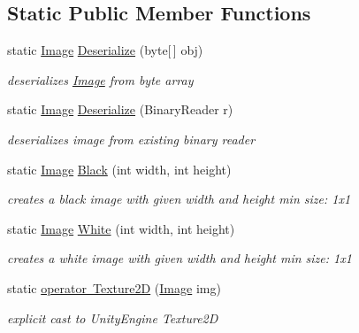 \subsection*{Static Public Member Functions}
\begin{DoxyCompactItemize}
\item 
static \mbox{\hyperlink{class_virt_muse_web_1_1_utility_1_1_image}{Image}} \mbox{\hyperlink{class_virt_muse_web_1_1_utility_1_1_image_ab45d281959b7e4d99408631f57f1d372}{Deserialize}} (byte\mbox{[}$\,$\mbox{]} obj)
\begin{DoxyCompactList}\small\item\em deserializes \mbox{\hyperlink{class_virt_muse_web_1_1_utility_1_1_image}{Image}} from byte array \end{DoxyCompactList}\item 
static \mbox{\hyperlink{class_virt_muse_web_1_1_utility_1_1_image}{Image}} \mbox{\hyperlink{class_virt_muse_web_1_1_utility_1_1_image_a0d1b4f954a69ba6cd90639d0d605a814}{Deserialize}} (Binary\+Reader r)
\begin{DoxyCompactList}\small\item\em deserializes image from existing binary reader \end{DoxyCompactList}\item 
static \mbox{\hyperlink{class_virt_muse_web_1_1_utility_1_1_image}{Image}} \mbox{\hyperlink{class_virt_muse_web_1_1_utility_1_1_image_a0c71d3c117265cce4de488f0ef1e793e}{Black}} (int width, int height)
\begin{DoxyCompactList}\small\item\em creates a black image with given width and height min size\+: 1x1 \end{DoxyCompactList}\item 
static \mbox{\hyperlink{class_virt_muse_web_1_1_utility_1_1_image}{Image}} \mbox{\hyperlink{class_virt_muse_web_1_1_utility_1_1_image_a2d472e394459543eddfdfe5dd2c14d7b}{White}} (int width, int height)
\begin{DoxyCompactList}\small\item\em creates a white image with given width and height min size\+: 1x1 \end{DoxyCompactList}\item 
static \mbox{\hyperlink{class_virt_muse_web_1_1_utility_1_1_image_ad31a5f8472bedbb30dc0c1448db5393b}{operator Texture2D}} (\mbox{\hyperlink{class_virt_muse_web_1_1_utility_1_1_image}{Image}} img)
\begin{DoxyCompactList}\small\item\em explicit cast to Unity\+Engine Texture2D \end{DoxyCompactList}\end{DoxyCompactItemize}
